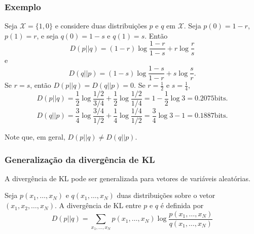 
\begin{frame}%
  \frametitle{Exemplo}
  Seja $\mathcal{X} = \{1,0\}$ e considere duas distribuições $p$ e $q$ em $\mathcal{X}$.
  Seja $p(0)=1-r$, $p(1)=r$, e seja $q(0)=1-s$ e $q(1)=s$. Então
  \begin{equation}
  D(p||q) = (1-r) \log \frac{1-r}{1-s} + r \log \frac{r}{s}
  \end{equation}
  e
  \begin{equation}
  D(q||p) = (1-s) \log \frac{1-s}{1-r} + s \log \frac{s}{r} .
  \end{equation}
  Se $r=s$, então $D(p||q)=D(q||p)=0$. Se $r=\frac{1}{2}$ e $s=\frac{1}{4}$, 
  \begin{equation}
  D(p||q) = \frac{1}{2} \log \frac{1/2}{3/4} + \frac{1}{2} \log \frac{1/2}{1/4} = 1 - \frac{1}{2} \log 3 = 0.2075 \text{bits.}
  \end{equation}
  \begin{equation}
  D(q||p) = \frac{3}{4} \log \frac{3/4}{1/2} + \frac{1}{4} \log \frac{1/4}{1/2} = \frac{3}{4} \log 3 - 1 = 0.1887 \text{bits.}
  \end{equation}

   Note que, em geral, $D(p||q) \neq D(q||p)$.
\end{frame}

\begin{frame}%
  \frametitle{Generalização da divergência de KL}
  A divergência de KL pode ser generalizada para vetores de variáveis aleatórias.

  Seja $p(x_1, \ldots, x_N)$ e $q(x_1, \ldots, x_N)$ duas distribuições sobre o vetor
  $(x_1, x_2, \ldots , x_N)$. A divergência de KL entre $p$ e $q$ é definida por
  \begin{equation}
  D(p||q) = \sum_{x_1, \ldots, x_N} p(x_1, \ldots, x_N) \log \frac{p(x_1, \ldots, x_N)}{q(x_1, \ldots, x_N)}
  \end{equation}
\end{frame}

